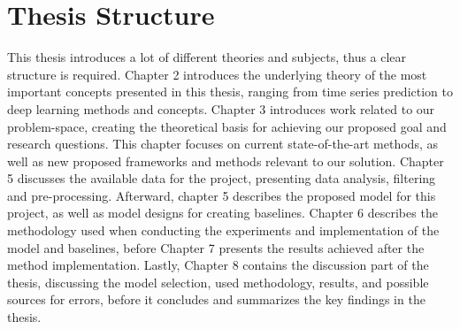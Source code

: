 
\section{Thesis Structure}
\label{sections:Introduction:Structure}

This thesis introduces a lot of different theories and subjects,
thus a clear structure is required.
Chapter 2 introduces the underlying theory of the most important concepts presented in this thesis,
ranging from time series prediction to deep learning methods and concepts.
Chapter 3 introduces work related to our problem-space, creating the theoretical basis for achieving our proposed goal and research questions.
This chapter focuses on current state-of-the-art methods,
as well as new proposed frameworks and methods relevant to our solution.
Chapter 5 discusses the available data for the project, presenting data analysis, filtering and pre-processing.
Afterward, chapter 5 describes the proposed model for this project, as well as model designs for creating baselines.
Chapter 6 describes the methodology used when conducting the experiments and implementation of the model and baselines,
before Chapter 7 presents the results achieved after the method implementation.
Lastly, Chapter 8 contains the discussion part of the thesis, discussing the model selection, used methodology, results, and possible sources for errors,
before it concludes and summarizes the key findings in the thesis.



\iffalse
  This thesis introduces a lot of different theories and subjects,
  thus a clear structure is required.
  Chapter 2 introduces the underlying theory of the most important concepts presented in this thesis,
  ranging from time series prediction to deep learning methods and concepts.
  Chapter 3 introduces work related to our problem-space, creating the theoretical basis for achieving our proposed goal and research questions.
  This chapter focuses on current state-of-the-art methods,
  as well as new proposed frameworks and methods relevant to our solution.
  Chapter 4 introduces our proposed method and architecture,
  presenting the model framework and model structure.
  Lastly, chapter 5 supplies an evaluation and discussion of the proposed framework regarding our proposed research questions and goal.
\fi

